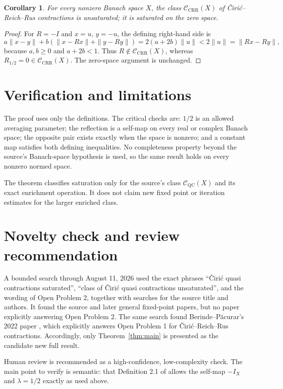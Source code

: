 \documentclass[11pt]{article}
\newtheorem{corollary}[theorem]{Corollary}
\newcommand{\CQC}{\mathcal C_{\mathrm{QC}}}
\newcommand{\CCRR}{\mathcal C_{\mathrm{CRR}}}
\begin{document}
\begin{corollary}
For every nonzero Banach space $X$, the class $\CCRR(X)$ of
\v Ciri\'c--Reich--Rus contractions is unsaturated; it is saturated on the
zero space.
\end{corollary}

\begin{proof}
For $R=-I$ and $x=u$, $y=-u$, the defining right-hand side is
\[
 a\|x-y\|+b(\|x-Rx\|+\|y-Ry\|)
 =2(a+2b)\|u\|<2\|u\|=\|Rx-Ry\|,
\]
because $a,b\ge0$ and $a+2b<1$.  Thus $R\notin\CCRR(X)$, whereas
$R_{1/2}=0\in\CCRR(X)$.  The zero-space argument is unchanged.
\end{proof}

\section{Verification and limitations}

The proof uses only the definitions.  The critical checks are: $1/2$ is an
allowed averaging parameter; the reflection is a self-map on every real or
complex Banach space; the opposite pair exists exactly when the space is
nonzero; and a constant map satisfies both defining inequalities.  No
completeness property beyond the source's Banach-space hypothesis is used, so
the same result holds on every nonzero normed space.

The theorem classifies saturation only for the source's class
$\CQC(X)$ and its exact enrichment operation.  It does not claim new fixed
point or iteration estimates for the larger enriched class.

\section{Novelty check and review recommendation}

A bounded search through August 11, 2026 used the exact phrases ``\v Ciri\'c
quasi contractions saturated'', ``class of \v Ciri\'c quasi contractions
unsaturated'', and the wording of Open Problem 2, together with searches for
the source title and authors.  It found the source and later general
fixed-point papers, but no paper explicitly answering Open Problem 2.  The
same search found Berinde--P\u acurar's 2022 paper \cite{BP22}, which explicitly
answers Open Problem 1 for \v Ciri\'c--Reich--Rus contractions.  Accordingly,
only Theorem~\ref{thm:main} is presented as the candidate new full result.

Human review is recommended as a high-confidence, low-complexity check.  The
main point to verify is semantic: that Definition 2.1 of \cite{BP21} allows
the self-map $-I_X$ and $\lambda=1/2$ exactly as used above.
\end{document}

